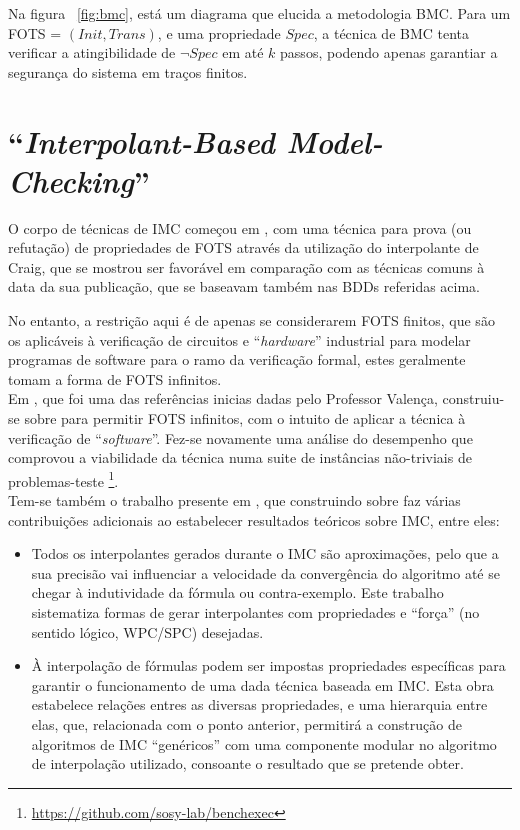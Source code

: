 \documentclass[11pt,a4paper]{report}%
\def\imc{``\textit{Interpolant-Based Model-Checking}''\xspace}
\begin{document}
Na figura ~\ref{fig:bmc}, está um diagrama que elucida a metodologia BMC.
Para um FOTS = $(Init, Trans)$, e uma propriedade $Spec$, a técnica de BMC
tenta verificar a atingibilidade de $\lnot Spec$ em até $k$ passos,
podendo apenas garantiar a segurança do sistema em traços finitos.

\section{\imc}
\label{state_of_art:imc}

O corpo de técnicas de IMC começou em \cite{interpolation_original}, com uma técnica para prova (ou refutação) de propriedades de FOTS através da utilização do interpolante de Craig, que se mostrou ser
favorável em comparação com as técnicas comuns à data da sua publicação, que se baseavam
também nas BDDs referidas acima.

No entanto, a restrição aqui é de apenas se considerarem FOTS finitos, que são os aplicáveis
à verificação de circuitos e ``\textit{hardware}'' industrial \textemdash para modelar
programas de software para o ramo da verificação formal, estes geralmente tomam a forma de
FOTS infinitos.\\

Em \cite{interpolation_state_of_art}, que foi uma das referências inicias dadas pelo
Professor Valença, construiu-se sobre \cite{interpolation_original} para permitir
FOTS infinitos, com o intuito de aplicar a técnica à verificação de ``\textit{software}''.
Fez-se novamente uma análise do desempenho que comprovou a viabilidade da técnica
numa suite de instâncias não-triviais de problemas-teste \footnote{\url{https://github.com/sosy-lab/benchexec}}.\\

Tem-se também o trabalho presente em \cite{interpolation_thesis}, que construindo
sobre \cite{interpolation_original} faz várias contribuições adicionais ao estabelecer
resultados teóricos sobre IMC, entre eles:
\begin{itemize}
    \item Todos os interpolantes gerados durante o IMC são aproximações, pelo que
    a sua precisão vai influenciar a velocidade da convergência do algoritmo até
    se chegar à indutividade da fórmula ou contra-exemplo.
    Este trabalho sistematiza formas de gerar interpolantes com propriedades
    e ``força'' (no sentido lógico, WPC/SPC) desejadas.
    \item À interpolação de fórmulas podem ser impostas propriedades específicas
    para garantir o funcionamento de uma dada técnica baseada em IMC. Esta obra
    estabelece relações entres as diversas propriedades, e uma hierarquia entre elas,
    que, relacionada com o ponto anterior, permitirá a construção de algoritmos
    de IMC ``genéricos'' com uma componente modular no algoritmo de interpolação
    utilizado, consoante o resultado que se pretende obter.
\end{itemize}
\end{document}
